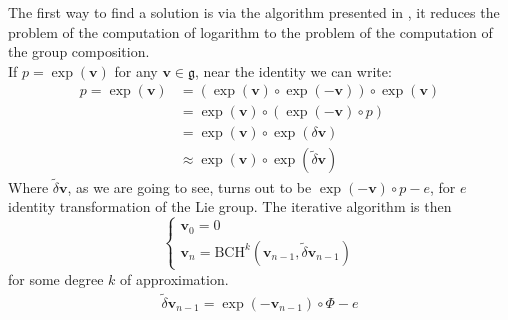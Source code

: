 The first way to find a solution is via the algorithm presented in \cite{Bossa:08}, it reduces the problem of the computation of logarithm to the problem of the computation of the group composition. \\
If $p= \exp(\mathbf{v})$ for any $\mathbf{v} \in \mathfrak{g}$, near the identity we can write:
\begin{align*}
p= \exp(\mathbf{v}) &= (\exp(\mathbf{v})\circ \exp(-\mathbf{v}))\circ \exp(\mathbf{v})\\
&= \exp(\mathbf{v})\circ (\exp(-\mathbf{v})\circ p)\\
&= \exp(\mathbf{v})\circ \exp(\delta \mathbf{v})\\
&\approx \exp(\mathbf{v})\circ \exp(\tilde{\delta} \mathbf{v})
\end{align*}
Where $\tilde{\delta} \mathbf{v}$, as we are going to see, turns out to be $ \exp(-\mathbf{v}) \circ p - e$, for $e$ identity transformation of the Lie group.
The iterative algorithm is then
\begin{equation}\label{eq:bossa_strat}
\begin{cases}
\mathbf{v}_0 = 0 \\
\mathbf{v}_{n} = \text{BCH}^{k}(\mathbf{v}_{n-1},\tilde{\delta} \mathbf{v}_{n-1})
\end{cases}
\end{equation}
for some degree $k$ of approximation.
\begin{align*}
\tilde{\delta} \mathbf{v}_{n-1} =  \exp(-\mathbf{v}_{n-1} )\circ \Phi - e
\end{align*}
%
